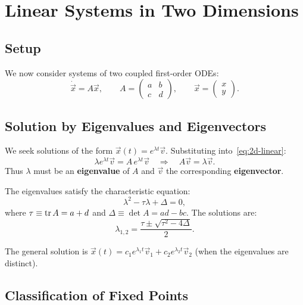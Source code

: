 \documentclass[11pt,letterpaper]{article}
\theoremstyle{definition}
\theoremstyle{plain}
\theoremstyle{remark}
\begin{document}
\section{Linear Systems in Two Dimensions}\label{sec:linear-2d}

\subsection{Setup}

We now consider systems of two coupled first-order ODEs:
\begin{equation}\label{eq:2d-linear}
  \dot{\vec{x}} = A\vec{x}, \qquad
  A = \begin{pmatrix} a & b \\ c & d \end{pmatrix}, \qquad
  \vec{x} = \begin{pmatrix} x \\ y \end{pmatrix}.
\end{equation}

\subsection{Solution by Eigenvalues and Eigenvectors}

We seek solutions of the form $\vec{x}(t) = e^{\lambda t}\vec{v}$.
Substituting into~\eqref{eq:2d-linear}:
\[
  \lambda e^{\lambda t}\vec{v} = A\, e^{\lambda t}\vec{v}
  \quad\Longrightarrow\quad A\vec{v} = \lambda\vec{v}.
\]
Thus $\lambda$ must be an \textbf{eigenvalue} of $A$ and $\vec{v}$ the
corresponding \textbf{eigenvector}.

The eigenvalues satisfy the characteristic equation:
\begin{equation}\label{eq:char-eq}
  \lambda^2 - \tau\lambda + \Delta = 0,
\end{equation}
where $\tau \equiv \tr A = a+d$ and $\Delta \equiv \det A = ad-bc$.
The solutions are:
\begin{equation}\label{eq:eigenvalues}
  \lambda_{1,2} = \frac{\tau \pm \sqrt{\tau^2 - 4\Delta}}{2}.
\end{equation}

The general solution is $\vec{x}(t) = c_1 e^{\lambda_1 t}\vec{v}_1
+ c_2 e^{\lambda_2 t}\vec{v}_2$ (when the eigenvalues are distinct).

\subsection{Classification of Fixed Points}\label{sec:classification}
\end{document}
